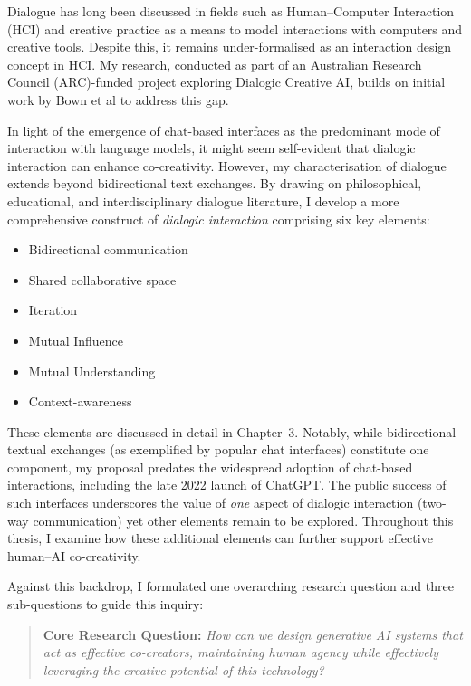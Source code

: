 Dialogue has long been discussed in fields such as Human--Computer Interaction (HCI) and creative practice as a means to model interactions with computers and creative tools. Despite this, it remains under-formalised as an interaction design concept in HCI. My research, conducted as part of an Australian Research Council (ARC)-funded project exploring Dialogic Creative AI, builds on initial work by Bown et al \cite{Bown2020-oc} to address this gap.

In light of the emergence of chat-based interfaces as the predominant mode of interaction with language models, it might seem self-evident that dialogic interaction can enhance co-creativity. However, my characterisation of dialogue extends beyond bidirectional text exchanges. By drawing on philosophical, educational, and interdisciplinary dialogue literature, I develop a more comprehensive construct of \emph{dialogic interaction} comprising six key elements:

\begin{itemize}
    \item Bidirectional communication
    \item Shared collaborative space
    \item Iteration
    \item Mutual Influence
    \item Mutual Understanding
    \item Context-awareness
\end{itemize}

These elements are discussed in detail in Chapter~3. Notably, while bidirectional textual exchanges (as exemplified by popular chat interfaces) constitute one component, my proposal predates the widespread adoption of chat-based interactions, including the late 2022 launch of ChatGPT. The public success of such interfaces underscores the value of \emph{one} aspect of dialogic interaction (two-way communication) yet other elements remain to be explored. Throughout this thesis, I examine how these additional elements can further support effective human--AI co-creativity.

Against this backdrop, I formulated one overarching research question and three sub-questions to guide this inquiry:

\begin{quote}
\textbf{Core Research Question:}
\emph{How can we design generative AI systems that act as effective co-creators, maintaining human agency while effectively leveraging the creative potential of this technology?}
\end{quote}

